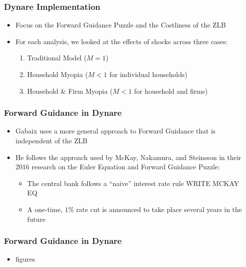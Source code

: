 \documentclass{beamer}
\begin{document}
\begin{frame}
	\frametitle{Dynare Implementation}
	\begin{itemize}
		\item Focus on the Forward Guidance Puzzle and the Costliness of the ZLB
		\vspace{8pt}
		\item For each analysis, we looked at the effects of shocks across three cases:
		\vspace{8pt}
		\begin{enumerate}
			\item Traditional Model ($M = 1$)
			\item Household Myopia ($M < 1$ for individual households)
			\item Household \& Firm Myopia ($M < 1$ for household and firms)
		\end{enumerate}
	\end{itemize}
\end{frame}


\begin{frame}
	\frametitle{Forward Guidance in Dynare}
	\begin{itemize}
		\item Gabaix uses a more general approach to Forward Guidance that is independent of the ZLB
		\vspace{8pt}
		\item He follows the approach used by McKay, Nakamura, and Steinsson in their 2016 research on the Euler Equation and Forward Guidance Puzzle:
		\vspace{8pt}
		\begin{itemize}
			\item The central bank follows a ``naive'' interest rate rule WRITE MCKAY EQ
			\item A one-time, $1\%$ rate cut is announced to take place several years in the future
		\end{itemize}
	\end{itemize}
\end{frame}


\begin{frame}
	\frametitle{Forward Guidance in Dynare}
	\begin{itemize}
		\item figures
	\end{itemize}
\end{frame}
\end{document}
